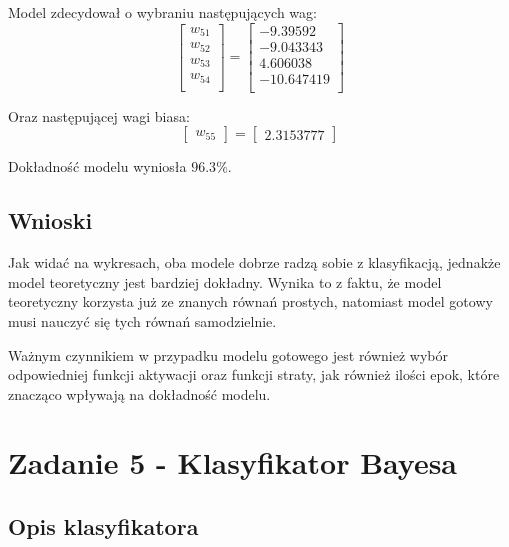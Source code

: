 \documentclass{article}
\begin{document}
Model zdecydował o wybraniu następujących wag:
\begin{equation*}
    \begin{bmatrix}
        w_{51} \\
        w_{52} \\
        w_{53} \\
        w_{54} \\
    \end{bmatrix}
    =
    \begin{bmatrix}
        -9.39592 \\
        -9.043343 \\
        4.606038 \\
        -10.647419 \\
    \end{bmatrix}
\end{equation*}

Oraz następującej wagi biasa:
\begin{equation*}
    \begin{bmatrix}
        w_{55}
    \end{bmatrix}
    =
    \begin{bmatrix}
        2.3153777
    \end{bmatrix}
\end{equation*}

Dokładność modelu wyniosła $96.3 \% $.

\subsection{Wnioski}

Jak widać na wykresach, oba modele dobrze radzą sobie z klasyfikacją,
jednakże model teoretyczny jest bardziej dokładny. Wynika to z faktu,
że model teoretyczny korzysta już ze znanych równań prostych, natomiast
model gotowy musi nauczyć się tych równań samodzielnie. 

Ważnym czynnikiem w przypadku modelu gotowego jest również wybór odpowiedniej
funkcji aktywacji oraz funkcji straty, jak również ilości epok, które 
znacząco wpływają na dokładność modelu.

\section{Zadanie 5 - Klasyfikator Bayesa}

\subsection{Opis klasyfikatora}
\end{document}
